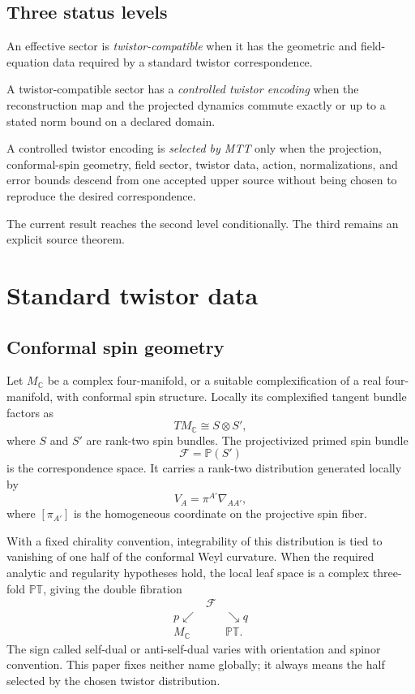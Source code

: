 \documentclass[11pt]{article}
\newcommand{\PT}{\mathbb{PT}}
\newcommand{\cF}{\mathcal{F}}
\begin{document}
\subsection{Three status levels}

\begin{definition}
An effective sector is \emph{twistor-compatible} when it has the geometric
and field-equation data required by a standard twistor correspondence.
\end{definition}

\begin{definition}
A twistor-compatible sector has a \emph{controlled twistor encoding} when
the reconstruction map and the projected dynamics commute exactly or up to
a stated norm bound on a declared domain.
\end{definition}

\begin{definition}
A controlled twistor encoding is \emph{selected by MTT} only when the
projection, conformal-spin geometry, field sector, twistor data, action,
normalizations, and error bounds descend from one accepted upper source
without being chosen to reproduce the desired correspondence.
\end{definition}

The current result reaches the second level conditionally. The third remains
an explicit source theorem.

\section{Standard twistor data}

\subsection{Conformal spin geometry}

Let \(M_{\mathbb C}\) be a complex four-manifold, or a suitable complexification
of a real four-manifold, with conformal spin structure. Locally its complexified
tangent bundle factors as
\[
TM_{\mathbb C}\cong S\otimes S',
\]
where \(S\) and \(S'\) are rank-two spin bundles. The projectivized primed
spin bundle
\[
\cF=\mathbb{P}(S')
\]
is the correspondence space. It carries a rank-two distribution generated
locally by
\[
V_A=\pi^{A'}\nabla_{AA'},
\]
where \([\pi_{A'}]\) is the homogeneous coordinate on the projective spin
fiber.

With a fixed chirality convention, integrability of this distribution is
tied to vanishing of one half of the conformal Weyl curvature. When the
required analytic and regularity hypotheses hold, the local leaf space is a
complex three-fold \(\PT\), giving the double fibration
\[
\begin{array}{ccc}
&\cF&\\[-0.4em]
p\swarrow&&\searrow q\\[-0.4em]
M_{\mathbb C}&&\PT .
\end{array}
\]
The sign called self-dual or anti-self-dual varies with orientation and
spinor convention. This paper fixes neither name globally; it always means
the half selected by the chosen twistor distribution.
\end{document}

